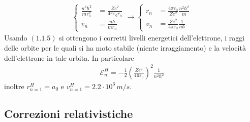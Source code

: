 \documentclass{article}
\begin{document}
\begin{gather}
    \begin{cases}
        \frac{n^2\hbar^2}{mr^2_n} &= \frac{Ze^2}{4\pi\varepsilon_0r_n} \\
        v_n &= \frac{n\hbar}{mr_n}
    \end{cases} \longrightarrow
    \begin{cases}
        r_n &= \frac{4\pi\varepsilon_0}{Ze^2}\frac{n^2\hbar^2}{m} \\
        v_n &= \frac{Ze^2}{4\pi\varepsilon_0}\frac{1}{n\hbar}
    \end{cases} \tag{1.1.7}
\end{gather}
Usando $(1.1.5)$ si ottengono i corretti livelli energetici dell'elettrone, i raggi delle orbite per le quali si ha moto stabile (niente irraggiamento) e la velocità dell'elettrone in tale orbita. In particolare
\begin{align}
    \mathcal{E}^H_n = -\frac{1}{2}\left(\frac{Ze^2}{4\pi\varepsilon_0}\right)^2\frac{1}{n^2\hbar^2} \tag{1.1.8}
\end{align}
inoltre $r^H_{n = 1} = a_0$ e $v^H_{n = 1} = 2.2 \cdot 10^6 \, m/s$.

\newpage
\subsection{Correzioni relativistiche}
\end{document}
